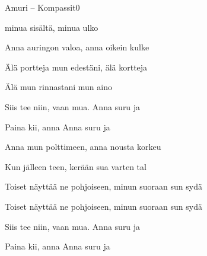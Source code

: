 \documentclass[12pt,a4paper]{article}
\begin{document}
\thispagestyle{empty}
\begin{mysong}{Amuri – Kompassit}{0}

\begin{SBVerse}
   minua sisältä,  minua ulko

  Anna  auringon valoa, anna  oikein kulke

  Älä  portteja mun edestäni, älä  kortteja

  Älä  mun rinnastani mun  aino
\end{SBVerse}

\begin{SBChorus}
  Siis  tee niin, vaan  mua.  Anna 
  suru ja 

  Paina  kii, anna  Anna 
  suru ja 
\end{SBChorus}

\begin{SBVerse}
  Anna  mun polttimeen, anna  nousta
  korkeu

  Kun  jälleen teen,  kerään sua varten
  tal

  Toiset  näyttää ne pohjoiseen, minun 
  suoraan sun sydä

  Toiset  näyttää ne pohjoiseen, minun 
  suoraan sun sydä
\end{SBVerse}

\begin{SBChorus}
  Siis  tee niin, vaan  mua.  Anna 
  suru ja 

  Paina  kii, anna  Anna 
  suru ja 
\end{SBChorus}

\end{mysong}
\end{document}
